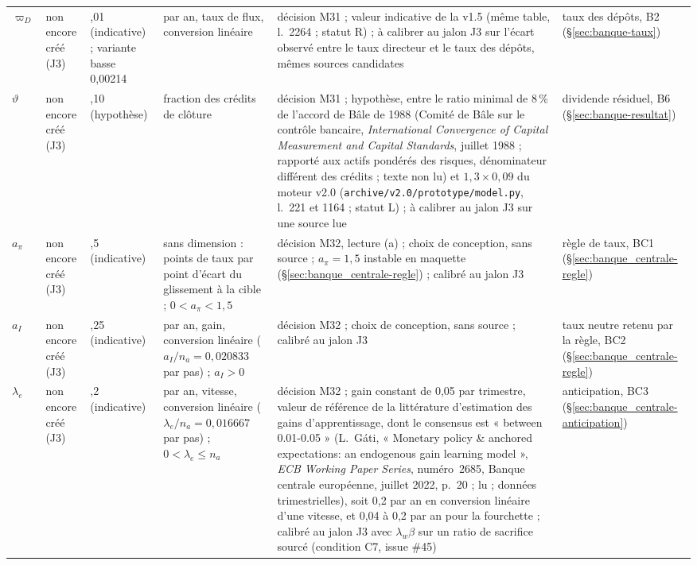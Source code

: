 \documentclass[11pt,a4paper]{article}
\begin{document}
\begin{center}
\begin{longtable}{p{1.5cm}>{\raggedright\arraybackslash}p{3.0cm}>{\raggedright\arraybackslash}p{1.4cm}>{\raggedright\arraybackslash}p{1.8cm}>{\raggedright\arraybackslash}p{3.4cm}>{\raggedright\arraybackslash}p{2.6cm}}
$\varpi_D$ & non encore créé (J3) & 0,01 (indicative) ; variante basse 0,00214 & par an, taux de flux, conversion linéaire & décision M31 ; valeur indicative de la v1.5 (même table, l.~2264 ; statut R) ; à calibrer au jalon J3 sur l'écart observé entre le taux directeur et le taux des dépôts, mêmes sources candidates & taux des dépôts, B2 (\S\ref{sec:banque-taux})\\
$\vartheta$ & non encore créé (J3) & 0,10 (hypothèse) & fraction des crédits de clôture & décision M31 ; hypothèse, entre le ratio minimal de 8\,\% de l'accord de Bâle de 1988 (Comité de Bâle sur le contrôle bancaire, \emph{International Convergence of Capital Measurement and Capital Standards}, juillet 1988 ; rapporté aux actifs pondérés des risques, dénominateur différent des crédits ; texte non lu) et $1{,}3 \times 0{,}09$ du moteur v2.0 (\nolinkurl{archive/v2.0/prototype/model.py}, l.~221 et 1164 ; statut L) ; à calibrer au jalon J3 sur une source lue & dividende résiduel, B6 (\S\ref{sec:banque-resultat})\\
$a_\pi$ & non encore créé (J3) & 0,5 (indicative) & sans dimension : points de taux par point d'écart du glissement à la cible ; $0 < a_\pi < 1{,}5$ & décision M32, lecture (a) ; choix de conception, sans source ; $a_\pi = 1{,}5$ instable en maquette (\S\ref{sec:banque_centrale-regle}) ; calibré au jalon J3 & règle de taux, BC1 (\S\ref{sec:banque_centrale-regle})\\
$a_I$ & non encore créé (J3) & 0,25 (indicative) & par an, gain, conversion linéaire ($a_I/n_a = 0{,}020833$ par pas) ; $a_I > 0$ & décision M32 ; choix de conception, sans source ; calibré au jalon J3 & taux neutre retenu par la règle, BC2 (\S\ref{sec:banque_centrale-regle})\\
$\lambda_e$ & non encore créé (J3) & 0,2 (indicative) & par an, vitesse, conversion linéaire ($\lambda_e/n_a = 0{,}016667$ par pas) ; $0 < \lambda_e \le n_a$ & décision M32 ; gain constant de 0,05 par trimestre, valeur de référence de la littérature d'estimation des gains d'apprentissage, dont le consensus est « between 0.01-0.05 » (L.~Gáti, « Monetary policy \& anchored expectations: an endogenous gain learning model », \emph{ECB Working Paper Series}, numéro~2685, Banque centrale européenne, juillet 2022, p.~20 ; lu ; données trimestrielles), soit 0,2 par an en conversion linéaire d'une vitesse, et 0,04 à 0,2 par an pour la fourchette ; calibré au jalon J3 avec $\lambda_w\beta$ sur un ratio de sacrifice sourcé (condition C7, issue \#45) & anticipation, BC3 (\S\ref{sec:banque_centrale-anticipation})\\

\end{longtable}
\end{center}
\end{document}
